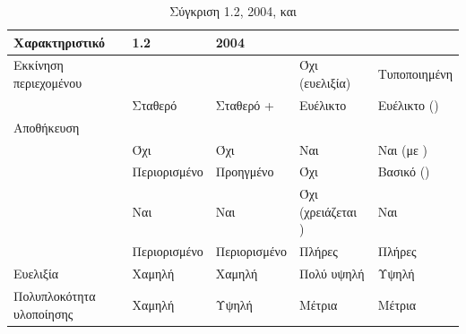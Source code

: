 \begin{table}[H]
\centering
\caption{Σύγκριση  1.2,  2004,  και }
\label{tab:standards_comparison}
\small
\setlength{\tabcolsep}{5pt}
\renewcommand{\arraystretch}{1.25}
\begin{chaptertablebox}
\begin{tabularx}{\textwidth}{|p{3.2cm}|Y|Y|Y|Y|}
\hline
\textbf{Χαρακτηριστικό} & \textbf{ 1.2} & \textbf{ 2004} & \textbf{} & \textbf{} \\
\hline
Εκκίνηση περιεχομένου &   &   & Όχι (ευελιξία) & Τυποποιημένη  \\
\hline
{}  & Σταθερό & Σταθερό +  & Ευέλικτο & Ευέλικτο () \\
\hline
Αποθήκευση &   &   &  &  \\
\hline
{}  & Όχι & Όχι & Ναι & Ναι (με ) \\
\hline
{} & Περιορισμένο & Προηγμένο & Όχι & Βασικό () \\
\hline
{} & Ναι & Ναι & Όχι (χρειάζεται ) & Ναι \\
\hline
{}  & Περιορισμένο & Περιορισμένο & Πλήρες & Πλήρες \\
\hline
Ευελιξία  & Χαμηλή & Χαμηλή & Πολύ υψηλή & Υψηλή \\
\hline
Πολυπλοκότητα υλοποίησης & Χαμηλή & Υψηλή & Μέτρια & Μέτρια \\
\hline
\end{tabularx}
\end{chaptertablebox}
\end{table}

